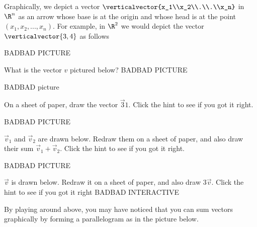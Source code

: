 	Graphically, we depict a vector $\verticalvector{x_1\\x_2\\.\\.\\x_n}$ in $\R^n$ as an arrow whose base is at the origin and whose head is at  the point $(x_1,x_2,...,x_n)$.  
	For example, in $\R^2$ we would depict the vector $\verticalvector{3,4}$ as follows
 	 
 	 BADBAD PICTURE
 	 
 	 \begin{question}
 	 	What is the vector $v$ pictured below?
 	 	BADBAD PICTURE
  	 \end{question}
  	 
  	 \begin{question}
  	 	\begin{hint}
  	 		BADBAD picture
  	 	\end{hint}
  	 	On a sheet of paper, draw the vector $\vec{3}{1}$. Click the hint to see if you got it right.
  	 \end{question}
  	 
  	 \begin{question}
  	 \begin{hint}
  	 	BADBAD PICTURE
  	 \end{hint}
  	 	 $\vec{v}_1$ and $\vec{v}_2$ are drawn below.  Redraw them on a sheet of paper, and also draw their sum $\vec{v}_1+\vec{v}_2$.
  	 	 Click the hint to see if you got it right.
  	 	
  	 \end{question}
  	 
  	 \begin{question}
  	 \begin{hint}
  	 BADBAD PICTURE
  	 \end{hint}
  	 	$\vec{v}$ is drawn below.  Redraw it on a sheet of paper, and also draw $3\vec{v}$.  Click the hint to see if you got it right
  	 	BADBAD INTERACTIVE
  	 \end{question}
  	 
  	 
  		By playing around above, you may have noticed that you can sum vectors graphically by forming a parallelogram as in the picture below.
  		
